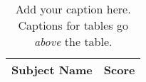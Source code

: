 %
%
\begin{table}[t]
    \centering
    \caption{
        \label{tab:plain-table}
        Add your caption here. Captions for tables go {\em above}
        the table.
    }
    \begin{tabular}{lr}
        \toprule
            {\bf Subject Name}  &
            {\bf Score}
            \\

        \midrule

        

        \bottomrule
    \end{tabular}
\end{table}